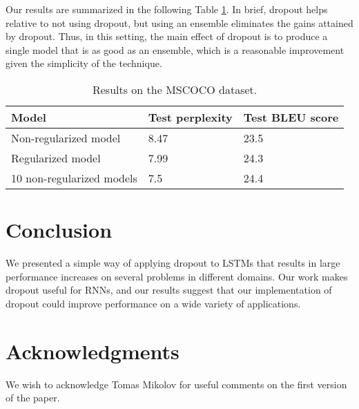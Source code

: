 \documentclass{article}
\begin{document}
Our results are summarized in the following Table \ref{tab:vis}.  In brief,
dropout helps relative to not using dropout, but using an ensemble
eliminates the gains attained by dropout.  Thus, in this setting,
the main effect of dropout is to produce a single model that is as
good as an ensemble, which is a reasonable improvement given
the simplicity of the technique.  
\begin{table}[t]
  \small
  \centering
  \renewcommand{\arraystretch}{1.15}
  \begin{tabular}{lll}
    \hline
     Model & Test perplexity & Test BLEU score \\
    \hline
    Non-regularized model & 8.47 & 23.5 \\
    Regularized model & 7.99 &  24.3 \\
    \hline
    10 non-regularized models  & 7.5  &  24.4 \\
    \hline
  \end{tabular}
  \caption{Results on the MSCOCO dataset. }
  \label{tab:vis}
\end{table}



\section{Conclusion}

We presented a simple way of applying dropout to LSTMs that results in
large performance increases on several problems in different domains.
Our work makes dropout useful for RNNs, and our results suggest that
our implementation of dropout could improve performance on a wide
variety of applications.

\section{Acknowledgments}

We wish to acknowledge Tomas Mikolov for useful comments on the first version of the paper.   

\small


\end{document}
